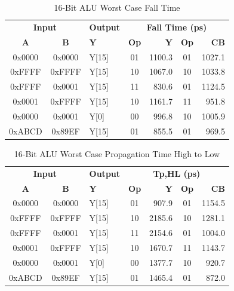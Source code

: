 \documentclass[11pt]{article}
\begin{document}
		
			\begin{table}[H]
				\centering
				\caption{16-Bit ALU Worst Case Fall Time}
				\label{tab:ALU-16-Bit-Falltime}
				\begin{tabular}{|cclcrcr|}
					\hline
					\multicolumn{2}{|c}{\textbf{Input}} & \textbf{Output} & \multicolumn{4}{c|}{\textbf{Fall Time (ps)}} \\
					\textbf{A} & \textbf{B} & \textbf{Y} & \textbf{Op} & \textbf{Y} & \textbf{Op} & \textbf{CB} \\
					\hline
					0x0000 & 0x0000 & Y{[}15{]} & 01 & 1100.3 & 01 & 1027.1 \\
					0xFFFF & 0xFFFF & Y{[}15{]} & 10 & 1067.0 & 10 & 1033.8 \\
					0xFFFF & 0x0001 & Y{[}15{]} & 11 & 830.6 & 01 & 1124.5 \\
					0x0001 & 0xFFFF & Y{[}15{]} & 10 & 1161.7 & 11 & 951.8 \\
					0x0000 & 0x0001 & Y{[}0{]} & 00 & 996.8 & 10 & 1005.9 \\
					0xABCD & 0x89EF & Y{[}15{]} & 01 & 855.5 & 01 & 969.5 \\
					\hline
				\end{tabular}
			\end{table}
		
		
			\begin{table}[H]
				\centering
				\caption{16-Bit ALU Worst Case Propagation Time High to Low}
				\label{tab:ALU-16-Bit-Tpd-HL}
				\begin{tabular}{|cclcrcr|}
					\hline
					\multicolumn{2}{|c}{\textbf{Input}} & \textbf{Output} & \multicolumn{4}{c|}{\textbf{Tp,HL (ps)}} \\
					\textbf{A} & \textbf{B} & \textbf{Y} & \textbf{Op} & \textbf{Y} & \textbf{Op} & \textbf{CB} \\
					\hline
					0x0000 & 0x0000 & Y{[}15{]} & 01 & 907.9 & 01 & 1154.5 \\
					0xFFFF & 0xFFFF & Y{[}15{]} & 10 & 2185.6 & 10 & 1281.1 \\
					0xFFFF & 0x0001 & Y{[}15{]} & 11 & 2154.6 & 01 & 1004.0 \\
					0x0001 & 0xFFFF & Y{[}15{]} & 10 & 1670.7 & 11 & 1143.7 \\
					0x0000 & 0x0001 & Y{[}0{]} & 00 & 1377.7 & 10 & 920.7 \\
					0xABCD & 0x89EF & Y{[}15{]} & 01 & 1465.4 & 01 & 872.0 \\
					\hline
				\end{tabular}
			\end{table}
		
\end{document}
